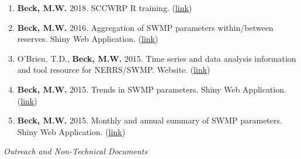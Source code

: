 \documentclass[letterpaper,12pt]{article}
\begin{document}
\begin{enumerate}
\item \textbf{Beck, M.W.} 2018. SCCWRP R training. ({\footnotesize\href{https://sccwrp.github.io/SCCWRP_R_training/}{link}})

\item \textbf{Beck, M.W.} 2016. Aggregation of SWMP parameters within/between reserves. Shiny Web Application. ({\footnotesize\href{http://beckmw.shinyapps.io/swmp_agg}{link}})

\item O'Brien, T.D., \textbf{Beck, M.W.} 2015. Time series and data analysis information and tool resource for NERRS/SWMP. Website. ({\footnotesize\href{http://swmprats.net/}{link}})

\item \textbf{Beck, M.W.} 2015. Trends in SWMP parameters. Shiny Web Application. ({\footnotesize\href{http://beckmw.shinyapps.io/swmp_comp/}{link}})

\item \textbf{Beck, M.W.} 2015. Monthly and annual summary of SWMP parameters. Shiny Web Application. ({\footnotesize\href{http://beckmw.shinyapps.io/swmp_summary/}{link}})

\end{enumerate}

\vspace{\baselineskip} 
\centerline{\large{\textit{Outreach and Non-Technical Documents}}}
\end{document}
